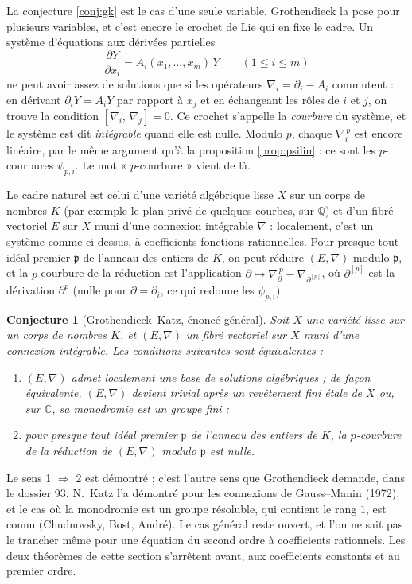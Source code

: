 \documentclass[11pt,a4paper]{article}
\theoremstyle{plain}
\newtheorem{conjecture}[theoreme]{Conjecture}
\theoremstyle{definition}
\theoremstyle{remark}
\newcommand{\Q}{\mathbb{Q}}
\newcommand{\C}{\mathbb{C}}
\newcommand{\cro}[2]{\left[#1,\,#2\right]}
\begin{document}
La conjecture \ref{conj:gk} est le cas d'une seule variable. Grothendieck la pose pour plusieurs variables, et c'est encore le crochet de Lie qui en fixe le cadre. Un système d'équations aux dérivées partielles
\[
  \frac{\partial Y}{\partial x_i} = A_i(x_1, \dots, x_m)\, Y \qquad (1 \leq i \leq m)
\]
ne peut avoir assez de solutions que si les opérateurs $\nabla_i = \partial_i - A_i$ commutent : en dérivant $\partial_i Y = A_i Y$ par rapport à $x_j$ et en échangeant les rôles de $i$ et $j$, on trouve la condition $\cro{\nabla_i}{\nabla_j} = 0$. Ce crochet s'appelle la \emph{courbure} du système, et le système est dit \emph{intégrable} quand elle est nulle. Modulo $p$, chaque $\nabla_i^{\,p}$ est encore linéaire, par le même argument qu'à la proposition \ref{prop:psilin} : ce sont les $p$-courbures $\psi_{p,i}$. Le mot « $p$-courbure » vient de là.

Le cadre naturel est celui d'une variété algébrique lisse $X$ sur un corps de nombres $K$ (par exemple le plan privé de quelques courbes, sur $\Q$) et d'un fibré vectoriel $E$ sur $X$ muni d'une connexion intégrable $\nabla$ : localement, c'est un système comme ci-dessus, à coefficients fonctions rationnelles. Pour presque tout idéal premier $\mathfrak p$ de l'anneau des entiers de $K$, on peut réduire $(E, \nabla)$ modulo $\mathfrak p$, et la $p$-courbure de la réduction est l'application $\partial \mapsto \nabla_\partial^{\,p} - \nabla_{\partial^{[p]}}$, où $\partial^{[p]}$ est la dérivation $\partial^p$ (nulle pour $\partial = \partial_i$, ce qui redonne les $\psi_{p,i}$).

\begin{conjecture}[Grothendieck--Katz, énoncé général]\label{conj:gkgen}
Soit $X$ une variété lisse sur un corps de nombres $K$, et $(E, \nabla)$ un fibré vectoriel sur $X$ muni d'une connexion intégrable. Les conditions suivantes sont équivalentes :
\begin{enumerate}[nosep]
\item $(E, \nabla)$ admet localement une base de solutions algébriques ; de façon équivalente, $(E, \nabla)$ devient trivial après un revêtement fini étale de $X$ ou, sur $\C$, sa monodromie est un groupe fini ;
\item pour presque tout idéal premier $\mathfrak p$ de l'anneau des entiers de $K$, la $p$-courbure de la réduction de $(E, \nabla)$ modulo $\mathfrak p$ est nulle.
\end{enumerate}
\end{conjecture}

Le sens 1 $\Rightarrow$ 2 est démontré ; c'est l'autre sens que Grothendieck demande, dans le dossier 93. N.~Katz l'a démontré pour les connexions de Gauss--Manin (1972), et le cas où la monodromie est un groupe résoluble, qui contient le rang $1$, est connu (Chudnovsky, Bost, André). Le cas général reste ouvert, et l'on ne sait pas le trancher même pour une équation du second ordre à coefficients rationnels. Les deux théorèmes de cette section s'arrêtent avant, aux coefficients constants et au premier ordre.
\end{document}
